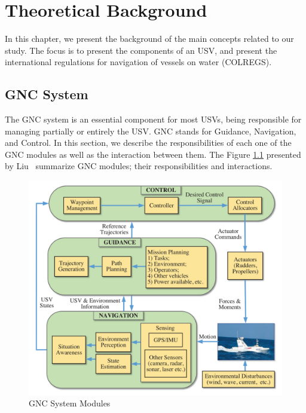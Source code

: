 \chapter{Theoretical Background \label{chap:2_TheoreticalBackground}}

    In this chapter, we present the background of the main concepts related to our study. The focus is to present the components of an \acl{USV}, and present the international regulations for navigation of vessels on water (\acs{COLREGS}).

\section{GNC System}
    
    The \acs{GNC} system is an essential component for most \acp{USV}, being responsible for managing partially or entirely the \ac{USV}. \acs{GNC} stands for Guidance, Navigation, and Control. In this section, we describe the responsibilities of each one of the \ac{GNC} modules as well as the interaction between them. The Figure \ref{fig:Liu2016Unmanned_GNCSystem} presented by Liu~\cite{Liu2016Unmanned} summarize \acs{GNC} modules; their responsibilities and interactions.
    
    \begin{figure}[H]
        \centering
        \includegraphics[scale=0.85]{figs/Chap2/Liu2016Unmanned_GNCSystem.png}
        \caption{\ac{GNC} System Modules~\cite{Liu2016Unmanned}}
        \label{fig:Liu2016Unmanned_GNCSystem}
    \end{figure}
    
